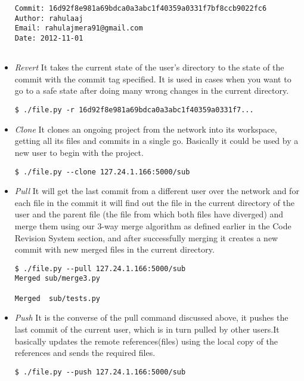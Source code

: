 \documentclass[12pt]{article}
\begin{document}
\begin{itemize}
\begin{lstlisting}
Commit: 16d92f8e981a69bdca0a3abc1f40359a0331f7bf8ccb9022fc6
Author: rahulaaj
Email: rahulajmera91@gmail.com
Date: 2012-11-01


\end{lstlisting}
\item \emph{Revert} It takes the current state of the user's directory to the state of the commit with the commit tag specified. It is used in cases when you want to go to a safe state after doing many wrong changes in the current directory.
\begin{lstlisting}
$ ./file.py -r 16d92f8e981a69bdca0a3abc1f40359a0331f7...
\end{lstlisting}
\item \emph{Clone} It clones an ongoing project from the network into its workspace, getting all its files and commits in a single go. Basically it could be used by a new user to begin with the project.
\begin{lstlisting}
$ ./file.py --clone 127.24.1.166:5000/sub
\end{lstlisting}

\item \emph{Pull} It will get the last commit from a different user over the network and for each file in the commit it will find out the file in the current directory of the user and the parent file (the file from which both files have diverged) and merge them using our 3-way merge algorithm as defined earlier in the Code Revision System section, and after successfully merging it creates a new commit with new merged files in the current directory.
\begin{lstlisting}
$ ./file.py --pull 127.24.1.166:5000/sub
Merged sub/merge3.py

Merged  sub/tests.py
\end{lstlisting}
\item \emph{Push} It is the converse of the pull command discussed above, it pushes the last commit of the current user, which is in turn pulled by other users.It basically updates the remote references(files) using the local copy of the references and sends the required files.
\begin{lstlisting}
$ ./file.py --push 127.24.1.166:5000/sub

\end{lstlisting}
\end{itemize}
\end{document}
